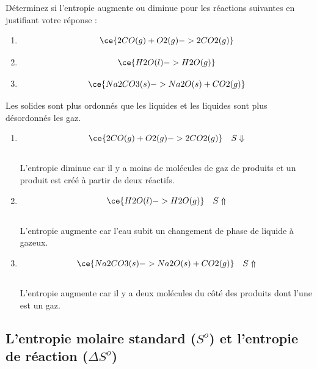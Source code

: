 \documentclass[
  11pt,
  french,
  a4paper,
  openany]{book}
\providecommand{\tightlist}{%
  \setlength{\itemsep}{0pt}\setlength{\parskip}{0pt}}
\begin{document}
\begin{Exercise}

Déterminez si l'entropie augmente ou diminue pour les réactions suivantes en justifiant votre réponse :

\begin{enumerate}
\def\labelenumi{\alph{enumi}.}
\tightlist
\item
  \[ \ce{2 CO(g) + O2(g) -> 2 CO2(g)} \]
\item
  \[ \ce{H2O(l) -> H2O(g)} \]
\item
  \[ \ce{Na2CO3(s) -> Na2O(s) +CO2(g)} \]
\end{enumerate}


\end{Exercise}

\begin{Answer}

Les solides sont plus ordonnés que les liquides et les liquides sont plus désordonnés les gaz.

\begin{enumerate}
\def\labelenumi{\alph{enumi}.}
\tightlist
\item
  \[ \ce{2 CO(g) + O2(g) -> 2 CO2(g)} \quad S \Downarrow \]\\
  L'entropie diminue car il y a moins de molécules de gaz de produits et un produit est créé à partir de deux réactifs.
\item
  \[ \ce{H2O(l) -> H2O(g)} \quad S \Uparrow \]\\
  L'entropie augmente car l'eau subit un changement de phase de liquide à gazeux.
\item
  \[ \ce{Na2CO3(s) -> Na2O(s) +CO2(g)} \quad S \Uparrow \]\\
  L'entropie augmente car il y a deux molécules du côté des produits dont l'une est un gaz.
\end{enumerate}


\end{Answer}

\hypertarget{lentropie-molaire-standard-so-et-lentropie-de-ruxe9action-delta-so}{%
\subsection{\texorpdfstring{L'entropie molaire standard (\(S^o\)) et l'entropie de réaction (\(\Delta S^o\))}{L'entropie molaire standard (S\^{}o) et l'entropie de réaction (\textbackslash Delta S\^{}o)}}\label{lentropie-molaire-standard-so-et-lentropie-de-ruxe9action-delta-so}}
\end{document}
